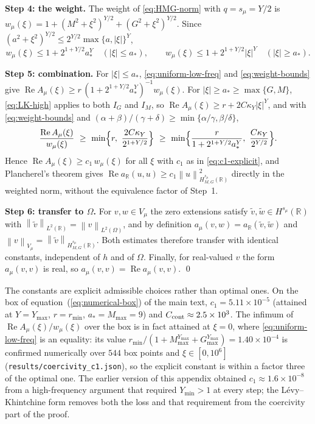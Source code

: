 \documentclass[supplement,hidelinks]{siamart251216}
\newcommand{\R}{\mathbb{R}}
\newcommand{\Vmu}{V_{\mu}}
\newcommand{\norm}[1]{\left\lVert #1\right\rVert}
\newcommand{\rf}{r}
\DeclareMathOperator{\Real}{Re}
\begin{document}
\medskip\noindent
\textbf{Step 4: the weight.}
The weight of \eqref{eq:HMG-norm} with $q=s_\mu=Y/2$ is
$w_\mu(\xi)=1+(M^2+\xi^2)^{Y/2}+(G^2+\xi^2)^{Y/2}$.  Since
$(a^2+\xi^2)^{Y/2}\le 2^{Y/2}\max\{a,|\xi|\}^{Y}$,
\begin{equation}
  w_\mu(\xi)\le 1+2^{1+Y/2}a_\ast^{Y}\quad(|\xi|\le a_\ast),\qquad
  w_\mu(\xi)\le 1+2^{1+Y/2}|\xi|^{Y}\quad(|\xi|\ge a_\ast).
  \label{eq:weight-bounds}
\end{equation}

\medskip\noindent
\textbf{Step 5: combination.}
For $|\xi|\le a_\ast$, \eqref{eq:uniform-low-freq} and \eqref{eq:weight-bounds} give
$\Real A_\mu(\xi)\ge \rf\,(1+2^{1+Y/2}a_\ast^{Y})^{-1}w_\mu(\xi)$.
For $|\xi|\ge a_\ast\ge\max\{G,M\}$, \eqref{eq:LK-high} applies to both $I_G$ and $I_M$, so
$\Real A_\mu(\xi)\ge \rf+2C\kappa_Y|\xi|^Y$, and with \eqref{eq:weight-bounds} and
$(\alpha+\beta)/(\gamma+\delta)\ge\min\{\alpha/\gamma,\beta/\delta\}$,
\[
  \frac{\Real A_\mu(\xi)}{w_\mu(\xi)}\ \ge\ \min\Bigl\{\rf,\ \frac{2C\kappa_Y}{2^{1+Y/2}}\Bigr\}
  \ \ge\ \min\Bigl\{\frac{\rf}{1+2^{1+Y/2}a_\ast^{Y}},\ \frac{C\kappa_Y}{2^{Y/2}}\Bigr\}.
\]
Hence $\Real A_\mu(\xi)\ge c_1\,w_\mu(\xi)$ for all $\xi$ with $c_1$ as in
\eqref{eq:c1-explicit}, and Plancherel's theorem gives
$\Real a_\R(u,u)\ge c_1\norm{u}_{H^{s_\mu}_{M,G}(\R)}^2$ directly in the weighted norm,
without the equivalence factor of Step~1.

\medskip\noindent
\textbf{Step 6: transfer to $\Omega$.}
For $v,w\in\Vmu$ the zero extensions satisfy
$\widetilde v,\widetilde w\in H^{s_\mu}(\R)$ with
$\norm{\widetilde v}_{L^2(\R)}=\norm{v}_{L^2(\Omega)}$, and by definition
$a_\mu(v,w)=a_\R(\widetilde v,\widetilde w)$ and
$\norm{v}_{\Vmu}=\norm{\widetilde v}_{H^{s_\mu}_{M,G}(\R)}$.  Both estimates
therefore transfer with identical constants, independent of $h$ and of
$\Omega$.  Finally, for real-valued $v$ the form $a_\mu(v,v)$ is real, so
$a_\mu(v,v)=\Real a_\mu(v,v)$.  \qed


The constants are explicit admissible choices rather than optimal ones.
On the box of equation~(\ref{eq:numerical-box}) of the main text, $c_1=5.11\times10^{-5}$ (attained at
$Y=Y_{\max}$, $\rf=r_{\min}$, $a_\ast=M_{\max}=9$) and $C_{\rm cont}\approx2.5\times10^3$.
The infimum of $\Real A_\mu(\xi)/w_\mu(\xi)$ over the box is in fact attained at $\xi=0$, where
\eqref{eq:uniform-low-freq} is an equality: its value $r_{\min}/(1+M_{\max}^{Y_{\max}}+G_{\max}^{Y_{\max}})
=1.40\times10^{-4}$ is confirmed numerically over $544$ box points and $\xi\in[0,10^6]$
(\texttt{results/coercivity\_c1.json}), so the explicit constant is within a factor three of the
optimal one.  The earlier version of this appendix obtained $c_1\approx1.6\times10^{-8}$ from a
high-frequency argument that required $Y_{\min}>1$ at every step; the L\'evy--Khintchine form
removes both the loss and that requirement from the coercivity part of the proof.
\end{document}
